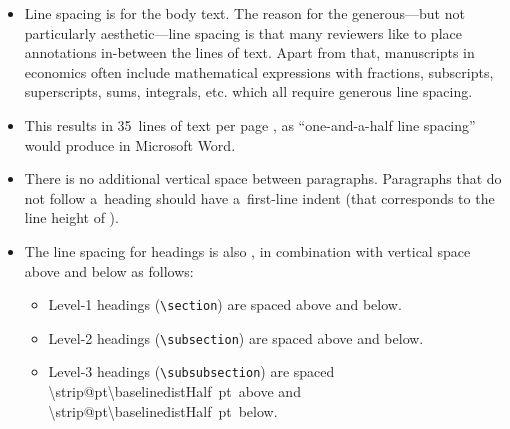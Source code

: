 \begin{itemize}
	\item Line spacing is \printlength{\baselinedist} for the body text. The reason for the generous---but not particularly aesthetic---line spacing is that many reviewers like to place annotations in-between the lines of text. Apart from that, manuscripts in economics often include mathematical expressions with fractions, subscripts, superscripts, sums, integrals, etc. which all require generous line spacing.
	\item This results in 35~lines of text per page
		\makeatletter%
		\ifdim \f@size pt < 11.5pt%
			(${35 \times 19.5\textup{~pt}} = 682.5\textup{~pt} = 24.08\textup{~cm}$)%
		\else%
			(${35 \times 20.7\textup{~pt}} = 724.5\textup{~pt} = 25.56\textup{~cm}$)%
		\fi%
		\makeatother%
		, as ``one-and-a-half line spacing'' would produce in Microsoft Word.
	\item There is no additional vertical space between paragraphs. Paragraphs that do not follow a~heading should have a~first-line indent (that corresponds to the line height of \printlength{\baselinedist}).
	\item The line spacing for headings is also \printlength{\baselinedist}, in combination with vertical space above and below as follows:
		\newlength{\baselinedistDouble}
		\setlength{\baselinedistDouble}{2\baselinedist}
		\newlength{\baselinedistHalf}
		\setlength{\baselinedistHalf}{0.5\baselinedist}
		\begin{itemize}
			\item Level-1 headings (\verb|\section|) are spaced \printlength{\baselinedistDouble} above and \printlength{\baselinedist} below.
			\item Level-2 headings (\verb|\subsection|) are spaced \printlength{\baselinedist} above and \printlength{\baselinedist} below.
			\item Level-3 headings (\verb|\subsubsection|) are spaced \makeatletter\SI[round-mode = places, round-precision = 2]{\strip@pt\baselinedistHalf}{pt}\makeatother\ above and \makeatletter\SI[round-mode = places, round-precision = 2]{\strip@pt\baselinedistHalf}{pt}\makeatother\ below.

\end{itemize}
\end{itemize}
